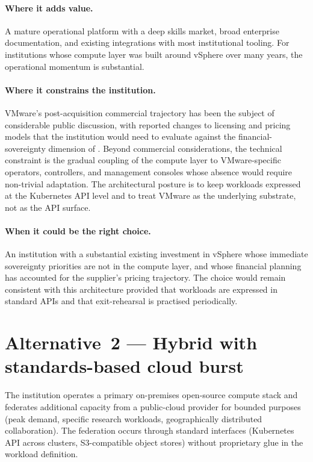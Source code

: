 \paragraph{Where it adds value.} A mature operational platform with
a deep skills market, broad enterprise documentation, and existing
integrations with most institutional tooling. For institutions whose
compute layer was built around vSphere over many years, the
operational momentum is substantial.

\paragraph{Where it constrains the institution.} VMware's
post-acquisition commercial trajectory has been the subject of
considerable public discussion, with reported changes to licensing
and pricing models that the institution would need to evaluate
against the financial-sovereignty dimension of
. Beyond commercial considerations,
the technical constraint is the gradual coupling of the compute
layer to VMware-specific operators, controllers, and management
consoles whose absence would require non-trivial adaptation. The
architectural posture is to keep workloads expressed at the
Kubernetes API level and to treat VMware as the underlying
substrate, not as the API surface.

\paragraph{When it could be the right choice.} An institution with
a substantial existing investment in vSphere whose immediate
sovereignty priorities are not in the compute layer, and whose
financial planning has accounted for the supplier's pricing
trajectory. The choice would remain consistent with this
architecture provided that workloads are expressed in standard APIs
and that exit-rehearsal is practised periodically.

\section{Alternative~2 --- Hybrid with standards-based cloud burst}
\label{sec:co-alt2}

\begin{alternativebox}
\noindent The institution operates a primary on-premises
open-source compute stack and federates additional capacity from
a public-cloud provider for bounded purposes (peak demand, specific
research workloads, geographically distributed collaboration). The
federation occurs through standard interfaces (Kubernetes API
across clusters, S3-compatible object stores) without proprietary
glue in the workload definition.
\end{alternativebox}

